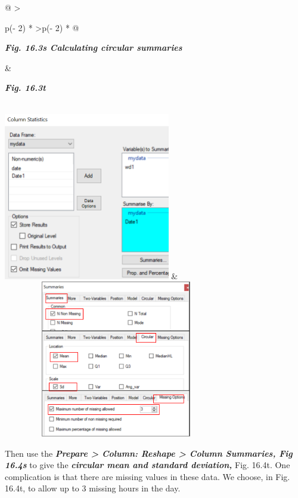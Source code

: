 \documentclass[
  letterpaper,
  DIV=11,
  numbers=noendperiod]{scrreprt}
\begin{document}
\begin{longtable}[]{@{}
  >{\raggedright\arraybackslash}p{(\columnwidth - 2\tabcolsep) * }
  >{\centering\arraybackslash}p{(\columnwidth - 2\tabcolsep) * }@{}}
\toprule\noalign{}
\begin{minipage}[b]{\linewidth}\raggedright
\textbf{\emph{Fig. 16.3s Calculating circular summaries}}
\end{minipage} & \begin{minipage}[b]{\linewidth}\centering
\textbf{\emph{Fig. 16.3t}}
\end{minipage} \\
\midrule\noalign{}
\endhead
\bottomrule\noalign{}
\endlastfoot
\includegraphics[width=2.86119in,height=2.87671in]{figures/Fig16.3s.png}
&
\includegraphics[width=3.88977in,height=2.69512in]{figures/Fig16.3t.png} \\
\end{longtable}

Then use the \textbf{\emph{Prepare \textgreater{} Column: Reshape
\textgreater{} Column Summaries, Fig 16.4s}} to give the
\textbf{\emph{circular mean and standard deviation,}} Fig. 16.4t. One
complication is that there are missing values in these data. We choose,
in Fig. 16.4t, to allow up to 3 missing hours in the day.
\end{document}
